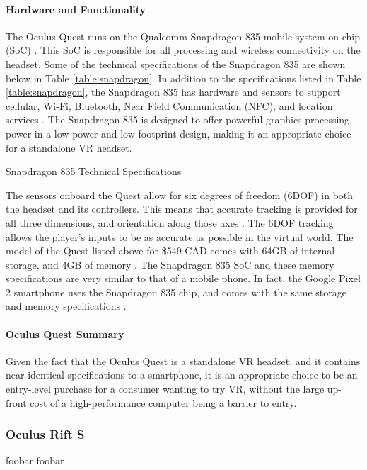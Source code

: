 \paragraph{Hardware and Functionality}
The Oculus Quest runs on the Qualcomm Snapdragon 835 mobile system on chip (SoC) \cite{oculus_dev_page}.
This SoC is responsible for all processing and wireless connectivity on the headset. Some 
of the technical specifications of the Snapdragon 835 are shown
below in Table \ref{table:snapdragon}. In addition to the specifications listed in Table
\ref{table:snapdragon}, the Snapdragon 835 has hardware and sensors to support
cellular, Wi-Fi, Bluetooth, Near Field Communication (NFC), and location services
\cite{snapdragon_835}. The Snapdragon 835 is designed to offer powerful graphics
processing power in a low-power and low-footprint design, making it an appropriate
choice for a standalone VR headset.

\begin{table}[h]
    \centering
    \caption{Snapdragon 835 Technical Specifications}
    \label{table:snapdragon} 
\end{table}

The sensors onboard the Quest allow for six degrees of freedom (6DOF) in both the headset
and its controllers. This means that accurate tracking is provided for all three dimensions,
and orientation along those axes \cite{sixdof_defn}. The 6DOF tracking allows the player's
inputs to be as accurate as possible in the virtual world. The model of the Quest 
listed above for \$549 CAD comes with 64GB of internal storage, and 4GB of memory
\cite{quest_timemag}. The Snapdragon 835 SoC and these memory specifications
are very similar to that of a mobile phone. In fact, the Google Pixel 2 smartphone
uses the Snapdragon 835 chip, and comes with the same storage and memory
specifications \cite{quest_polygon}.

\paragraph{Oculus Quest Summary}
Given the fact that the Oculus Quest is a standalone VR headset, and it contains
near identical specifications to a smartphone, it is an appropriate choice to
be an entry-level purchase for a consumer wanting to try VR, without the large
up-front cost of a high-performance computer being a barrier to entry.

\subsubsection{Oculus Rift S}
foobar foobar

